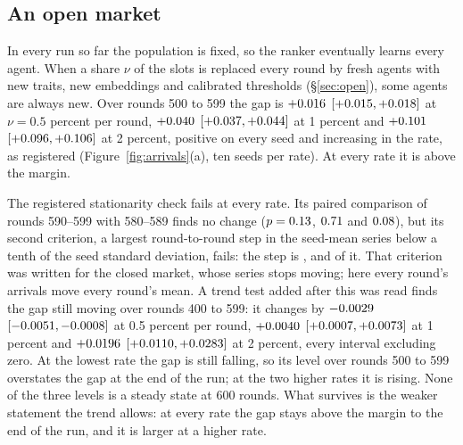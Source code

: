 \begin{table}[t]
\centering

\caption{Share of the control arm's decay that survives a warm start, four
constructions, each computed per seed and averaged, 95\% $t$ interval over twenty
seeds per set. Round-0 basis: (warm$_0$ $-$ warm$_{299}$) / (control$_0$ $-$
control$_{299}$); peak basis: each arm from its own maximum. Gap: NCF minus oracle
Gini; level: NCF Gini. The registered primary is the gap on the round-0 basis.
Source: \texttt{data/processed/horizon/e13d\_warm/analysis/summary.csv}.}
\label{tab:warm}
\end{table}

\subsection{An open market}
\label{sec:arrivals}

In every run so far the population is fixed, so the ranker eventually learns every
agent. When a share $\nu$ of the slots is replaced every round by fresh agents
with new traits, new embeddings and calibrated thresholds (\S\ref{sec:open}),
some agents are always new. Over rounds 500 to 599 the gap is $+0.016$
$[+0.015, +0.018]$ at $\nu = 0.5$ percent per round, $+0.040$
$[+0.037, +0.044]$ at 1 percent and $+0.101$
$[+0.096, +0.106]$ at 2 percent, positive on every seed and
increasing in the rate, as registered (Figure~\ref{fig:arrivals}(a), ten seeds per
rate). At every rate it is above the margin.

The registered stationarity check fails at every rate. Its paired comparison of
rounds 590--599 with 580--589 finds no change ($p = 0.13$, $0.71$ and
$0.08$), but its second criterion, a largest round-to-round step in the
seed-mean series below a tenth of the seed standard deviation, fails: the step is
\stepRatioLow{}, \stepRatioMid{} and \stepRatioHigh{} of it. That criterion was
written for the closed market, whose series stops moving; here every round's
arrivals move every round's mean. A trend test added after this was read finds the
gap still moving over rounds 400 to 599: it changes by $-0.0029$ $[-0.0051,
-0.0008]$ at 0.5 percent per round, $+0.0040$ $[+0.0007, +0.0073]$
at 1 percent and $+0.0196$ $[+0.0110, +0.0283]$ at 2 percent, every
interval excluding zero. At the lowest rate the gap is still falling, so its level
over rounds 500 to 599 overstates the gap at the end of the run; at the two higher
rates it is rising. None of the three levels is a steady state at 600 rounds.
What survives is the weaker statement the trend allows: at every rate the
gap stays above the margin to the end of the run, and it is larger at a higher
rate.

